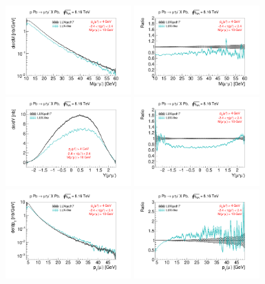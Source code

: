 \begin{figure}[]
\includegraphics[width=0.43\textwidth]{figures/Mll_inc_cut_kt.pdf}
\includegraphics[width=0.43\textwidth]{figures/RatioMll_inc_cut_kt.pdf}
\includegraphics[width=0.43\textwidth]{figures/Yll_inc_cut_kt.pdf}
\includegraphics[width=0.43\textwidth]{figures/RatioYll_inc_cut_kt.pdf}
\includegraphics[width=0.43\textwidth]{figures/pTl_inc_cut_kt.pdf}
\includegraphics[width=0.43\textwidth]{figures/RatiopTl_inc_cut_kt.pdf}

\end{figure}
